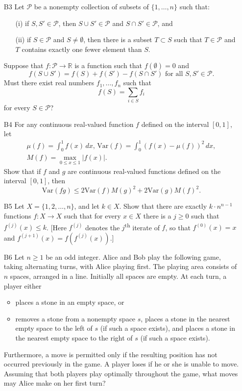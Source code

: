 \documentclass[amssymb,twocolumn,pra,10pt,aps]{revtex4-1}
\begin{document}
\begin{itemize}
\item[B3]
Let $\mathcal{P}$ be a nonempty collection of subsets of $\{1,\dots, n\}$ such that:
\begin{enumerate}
\item[(i)]
if $S, S' \in \mathcal{P}$, then $S \cup S' \in \mathcal{P}$ and $S \cap S' \in \mathcal{P}$, and
\item[(ii)]
if $S \in \mathcal{P}$ and $S \neq \emptyset$, then there is a subset $T \subset S$
such that $T \in \mathcal{P}$ and $T$ contains exactly one fewer element than $S$.
\end{enumerate}
Suppose that $f: \mathcal{P} \to \mathbb{R}$ is a function such that
$f(\emptyset) = 0$ and
\[
f(S \cup S') = f(S) + f(S') - f(S \cap S') \mbox{ for all $S,S' \in \mathcal{P}$.}
\]
Must there exist real numbers $f_1,\dots,f_n$ such that
\[
f(S) = \sum_{i \in S} f_i
\]
for every $S \in \mathcal{P}$?

\item[B4]
For any continuous real-valued function $f$ defined on the interval $[0,1]$, let
\begin{gather*}
\mu(f) = \int_0^1 f(x)\,dx, \,
\mathrm{Var}(f) = \int_0^1 (f(x) - \mu(f))^2\,dx, \\
M(f) = \max_{0 \leq x \leq 1} \left| f(x) \right|.
\end{gather*}
Show that if $f$ and $g$ are continuous real-valued functions
defined on the interval $[0,1]$,
then
\[
\mathrm{Var}(fg) \leq 2 \mathrm{Var}(f) M(g)^2 + 2 \mathrm{Var}(g) M(f)^2.
\]

\item[B5]
Let $X = \{1, 2, \dots, n\}$, and let $k \in X$. Show that there are exactly $k \cdot n^{n-1}$ functions $f: X \to X$ such that for every $x \in X$ there is a $j \geq 0$ such that $f^{(j)}(x) \leq k$.
[Here $f^{(j)}$ denotes the $j$\textsuperscript{th} iterate of $f$, so that $f^{(0)}(x) = x$ and $f^{(j+1)}(x) = f(f^{(j)}(x))$.]

\item[B6]
Let $n \geq 1$ be an odd integer. Alice and Bob play the following game,
taking alternating turns, with Alice playing first. 
The playing area consists of $n$ spaces, arranged in a line.
Initially all spaces are empty.
At each turn, a player either
\begin{itemize}
\item
places a stone in an empty space, or
\item
removes a stone from a nonempty space $s$, 
places a stone in the nearest empty space to the left of $s$
(if such a space exists),
and places a stone in the nearest empty space to the right of $s$
(if such a space exists).
\end{itemize}
Furthermore, a move is permitted only if the resulting position has not occurred previously in the game. A player loses if he or she is unable to move. Assuming that both players play optimally throughout the game, what moves may Alice make on her first turn?

\end{itemize}
\end{document}
